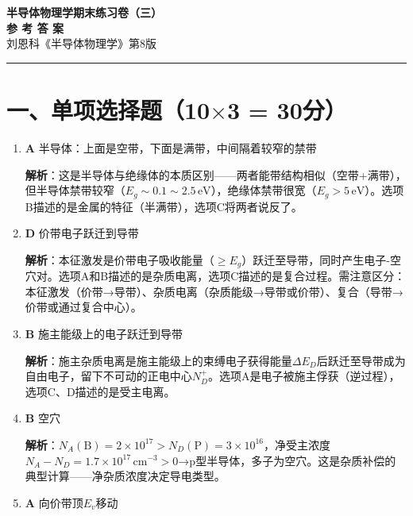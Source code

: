\documentclass[12pt,a4paper]{ctexart}
\begin{document}
\begin{center}
{\LARGE \textbf{半导体物理学\quad 期末练习卷（三）}}\\[4pt]
{\Large \textbf{参 考 答 案}}\\[6pt]
{\normalsize 刘恩科《半导体物理学》第8版}
\end{center}

\vspace{8pt}
\hrule
\vspace{8pt}

\section*{一、单项选择题（10$\times$3 = 30分）}

\begin{enumerate}[label=\arabic*.,nosep,leftmargin=2em]

\item \textbf{A} 半导体：上面是空带，下面是满带，中间隔着较窄的禁带

\textbf{解析}：这是半导体与绝缘体的本质区别——两者能带结构相似（空带+满带），但半导体禁带较窄（$E_g \sim 0.1\sim 2.5\,\text{eV}$），绝缘体禁带很宽（$E_g > 5\,\text{eV}$）。选项B描述的是金属的特征（半满带），选项C将两者说反了。

\item \textbf{D} 价带电子跃迁到导带

\textbf{解析}：本征激发是价带电子吸收能量（$\ge E_g$）跃迁至导带，同时产生电子-空穴对。选项A和B描述的是杂质电离，选项C描述的是复合过程。需注意区分：本征激发（价带→导带）、杂质电离（杂质能级→导带或价带）、复合（导带→价带或通过复合中心）。

\item \textbf{B} 施主能级上的电子跃迁到导带

\textbf{解析}：施主杂质电离是施主能级上的束缚电子获得能量$\Delta E_D$后跃迁至导带成为自由电子，留下不可动的正电中心$N_D^+$。选项A是电子被施主俘获（逆过程），选项C、D描述的是受主电离。

\item \textbf{B} 空穴

\textbf{解析}：$N_A(\text{B}) = 2\times10^{17} > N_D(\text{P}) = 3\times10^{16}$，净受主浓度$N_A - N_D = 1.7\times10^{17}\,\text{cm}^{-3} > 0$→p型半导体，多子为空穴。这是杂质补偿的典型计算——净杂质浓度决定导电类型。

\item \textbf{A} 向价带顶$E_v$移动


\end{enumerate}
\end{document}
